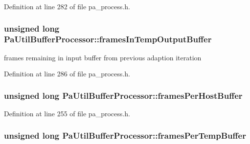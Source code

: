 Definition at line 282 of file pa\+\_\+process.\+h.

\subsubsection[{\texorpdfstring{frames\+In\+Temp\+Output\+Buffer}{framesInTempOutputBuffer}}]{\setlength{\rightskip}{0pt plus 5cm}unsigned long Pa\+Util\+Buffer\+Processor\+::frames\+In\+Temp\+Output\+Buffer}\hypertarget{struct_pa_util_buffer_processor_a7cb25636fa0e415bdbd87469b5fa4a03}{}\label{struct_pa_util_buffer_processor_a7cb25636fa0e415bdbd87469b5fa4a03}
frames remaining in input buffer from previous adaption iteration 

Definition at line 286 of file pa\+\_\+process.\+h.

\subsubsection[{\texorpdfstring{frames\+Per\+Host\+Buffer}{framesPerHostBuffer}}]{\setlength{\rightskip}{0pt plus 5cm}unsigned long Pa\+Util\+Buffer\+Processor\+::frames\+Per\+Host\+Buffer}\hypertarget{struct_pa_util_buffer_processor_aeec9ebf0c415b1e8aa4b1667ebbc839a}{}\label{struct_pa_util_buffer_processor_aeec9ebf0c415b1e8aa4b1667ebbc839a}


Definition at line 255 of file pa\+\_\+process.\+h.

\subsubsection[{\texorpdfstring{frames\+Per\+Temp\+Buffer}{framesPerTempBuffer}}]{\setlength{\rightskip}{0pt plus 5cm}unsigned long Pa\+Util\+Buffer\+Processor\+::frames\+Per\+Temp\+Buffer}\hypertarget{struct_pa_util_buffer_processor_a583f3db6161dbf7a79fb9b56f7c578a0}{}\label{struct_pa_util_buffer_processor_a583f3db6161dbf7a79fb9b56f7c578a0}


